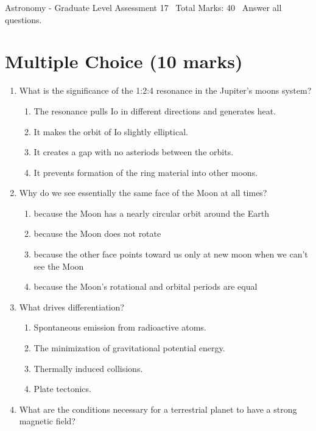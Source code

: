 \documentclass[12pt]{article}
\begin{document}
\begin{center}
Astronomy - Graduate Level Assessment 17 \
Total Marks: 40 \
Answer all questions.
\end{center}

\section*{Multiple Choice (10 marks)}
\begin{enumerate}[label=\arabic*.]
\item What is the significance of the 1:2:4 resonance in the Jupiter's moons system?
\begin{enumerate}[label=(\alph*)]
    \item The resonance pulls Io in different directions and generates heat.
    \item It makes the orbit of Io slightly elliptical.
    \item It creates a gap with no asteriods between the orbits.
    \item It prevents formation of the ring material into other moons.
\end{enumerate}
\item Why do we see essentially the same face of the Moon at all times?
\begin{enumerate}[label=(\alph*)]
    \item because the Moon has a nearly circular orbit around the Earth
    \item because the Moon does not rotate
    \item because the other face points toward us only at new moon when we can't see the Moon
    \item because the Moon's rotational and orbital periods are equal
\end{enumerate}
\item What drives differentiation?
\begin{enumerate}[label=(\alph*)]
    \item Spontaneous emission from radioactive atoms.
    \item The minimization of gravitational potential energy.
    \item Thermally induced collisions.
    \item Plate tectonics.
\end{enumerate}
\item What are the conditions necessary for a terrestrial planet to have a strong magnetic field?
\begin{enumerate}[label=(\alph*)]

\end{enumerate}
\end{enumerate}
\end{document}
